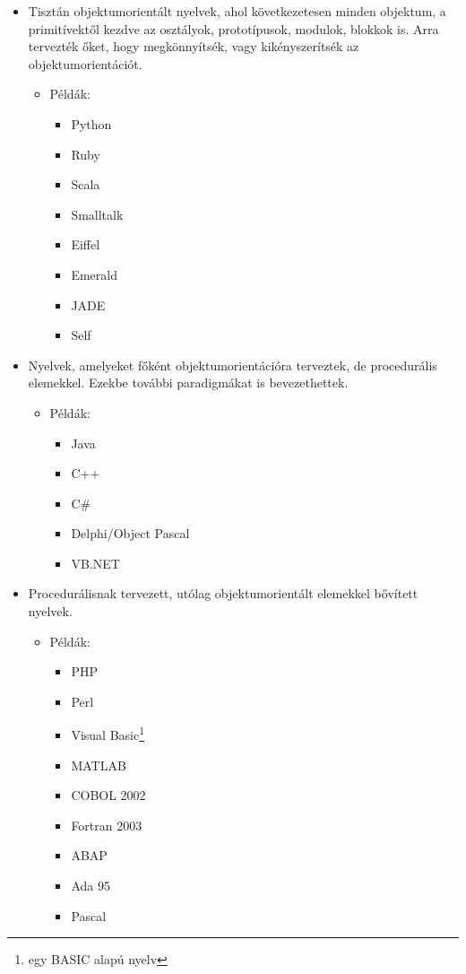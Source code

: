 \documentclass[a4paper,12pt,twoside]{report}
\theoremstyle{definition}
\begin{document}
	\begin{itemize}
	\item Tisztán objektumorientált nyelvek, ahol következetesen minden objektum, a primitívektől kezdve az osztályok, prototípusok, modulok, blokkok is. Arra tervezték őket, hogy megkönnyítsék, vagy kikényszerítsék az objektumorientációt.
	\begin{itemize}
		\item Példák: 
		\begin{itemize}
			\item Python
			\item Ruby
			\item Scala
			\item Smalltalk
			\item Eiffel
			\item Emerald
			\item JADE
			\item Self
		\end{itemize}
	\end{itemize}
			
	\item Nyelvek, amelyeket főként objektumorientációra terveztek, de procedurális elemekkel. Ezekbe további paradigmákat is bevezethettek.
	\begin{itemize}
		\item Példák: 
		\begin{itemize}
			\item Java
			\item C++
			\item C\#
			\item Delphi/Object Pascal
			\item VB.NET
		\end{itemize}
	\end{itemize}
	
	\item Procedurálisnak tervezett, utólag objektumorientált elemekkel bővített nyelvek.
	\begin{itemize}
		\item Példák: 
		\begin{itemize}
			\item PHP
			\item Perl
			\item Visual Basic\footnote{egy BASIC alapú nyelv}
			\item MATLAB
			\item COBOL 2002
			\item Fortran 2003
			\item ABAP
			\item Ada 95
			\item Pascal
		\end{itemize}
	\end{itemize}


\end{itemize}
\end{document}
